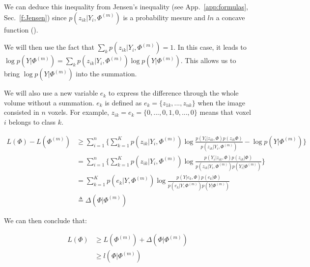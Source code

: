 We can deduce this inequality from Jensen's inequality (see App.~\ref{app:formulas}, Sec.~\ref{f:Jensen}) since  $p(z_{ik}|Y_i,\Phi^{(m)})$ is a probability mesure and $ln$ a concave function (\cite{5}). %

\par
We will then use the fact that  $\sum_k p(z_{ik}|Y_i,\Phi^{(m)})=1$. In this case, it leads to $\operatorname*{log} p(Y|\Phi^{(m)})=\sum_k p(z_{ik}|Y_i,\Phi^{(m)})\operatorname*{log} p(Y|\Phi^{(m)})$. This allows us to bring $\operatorname*{log} p(Y|\Phi^{(m)})$ into the summation. 
\par
We will also use a new variable $e_k$ to express the difference through the whole volume without a summation. $e_k$ is defined as $e_k=\{z_{1k}, ..., z_{nk}\}$ when the image consisted in $n$ voxels. For example, $z_{ik}=e_k=\{0,...,0,1,0,...,0\}$ means that voxel $i$ belongs to class $k$.

  \begin{align*}
  L(\Phi)-L(\Phi^{(m)}) &\geq \sum_{i=1}^n\{\sum_{k=1}^K p(z_{ik}|Y_i,\Phi^{(m)})\operatorname*{log} \frac{p(Y_i|z_{ik},\Phi)p(z_{ik}\Phi)}{p(z_{ik}|Y_i,\Phi^{(m)})}-\operatorname*{log} p(Y|\Phi^{(m)})\} \\
                    &=\sum_{i=1}^n\{\sum_{k=1}^K   p(z_{ik}|Y_i,\Phi^{(m)})\operatorname*{log} \frac{p(Y_i|z_{ik},\Phi)p(z_{ik}|\Phi)}{p(z_{ik}|Y_i,\Phi^{(m)})p(Y_i|\Phi^{(m)})}\}\\
                    &=\sum_{k=1}^K   p(e_{k}|Y,\Phi^{(m)})\operatorname*{log} \frac{p(Y|e_{k},\Phi)p(e_{k}|\Phi)}{p(e_{k}|Y,\Phi^{(m)})p(Y|\Phi^{(m)})}\\
                    &\triangleq \Delta(\Phi|\Phi^{(m)})
  \end{align*}

We can then conclude that:

  \begin{align*}
  L(\Phi) &\geq L(\Phi^{(m)}) + \Delta(\Phi|\Phi^{(m)})\\
          &\geq l(\Phi|\Phi^{(m)})
  \end{align*}

